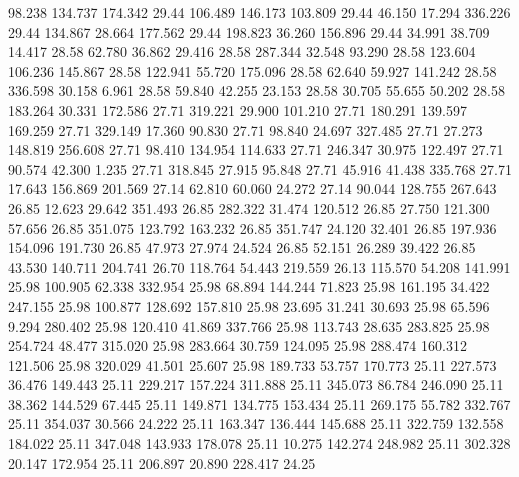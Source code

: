   98.238  134.737  174.342        29.44
 106.489  146.173  103.809        29.44
  46.150   17.294  336.226        29.44
 134.867   28.664  177.562        29.44
 198.823   36.260  156.896        29.44
  34.991   38.709   14.417        28.58
  62.780   36.862   29.416        28.58
 287.344   32.548   93.290        28.58
 123.604  106.236  145.867        28.58
 122.941   55.720  175.096        28.58
  62.640   59.927  141.242        28.58
 336.598   30.158    6.961        28.58
  59.840   42.255   23.153        28.58
  30.705   55.655   50.202        28.58
 183.264   30.331  172.586        27.71
 319.221   29.900  101.210        27.71
 180.291  139.597  169.259        27.71
 329.149   17.360   90.830        27.71
  98.840   24.697  327.485        27.71
  27.273  148.819  256.608        27.71
  98.410  134.954  114.633        27.71
 246.347   30.975  122.497        27.71
  90.574   42.300    1.235        27.71
 318.845   27.915   95.848        27.71
  45.916   41.438  335.768        27.71
  17.643  156.869  201.569        27.14
  62.810   60.060   24.272        27.14
  90.044  128.755  267.643        26.85
  12.623   29.642  351.493        26.85
 282.322   31.474  120.512        26.85
  27.750  121.300   57.656        26.85
 351.075  123.792  163.232        26.85
 351.747   24.120   32.401        26.85
 197.936  154.096  191.730        26.85
  47.973   27.974   24.524        26.85
  52.151   26.289   39.422        26.85
  43.530  140.711  204.741        26.70
 118.764   54.443  219.559        26.13
 115.570   54.208  141.991        25.98
 100.905   62.338  332.954        25.98
  68.894  144.244   71.823        25.98
 161.195   34.422  247.155        25.98
 100.877  128.692  157.810        25.98
  23.695   31.241   30.693        25.98
  65.596    9.294  280.402        25.98
 120.410   41.869  337.766        25.98
 113.743   28.635  283.825        25.98
 254.724   48.477  315.020        25.98
 283.664   30.759  124.095        25.98
 288.474  160.312  121.506        25.98
 320.029   41.501   25.607        25.98
 189.733   53.757  170.773        25.11
 227.573   36.476  149.443        25.11
 229.217  157.224  311.888        25.11
 345.073   86.784  246.090        25.11
  38.362  144.529   67.445        25.11
 149.871  134.775  153.434        25.11
 269.175   55.782  332.767        25.11
 354.037   30.566   24.222        25.11
 163.347  136.444  145.688        25.11
 322.759  132.558  184.022        25.11
 347.048  143.933  178.078        25.11
  10.275  142.274  248.982        25.11
 302.328   20.147  172.954        25.11
 206.897   20.890  228.417        24.25
